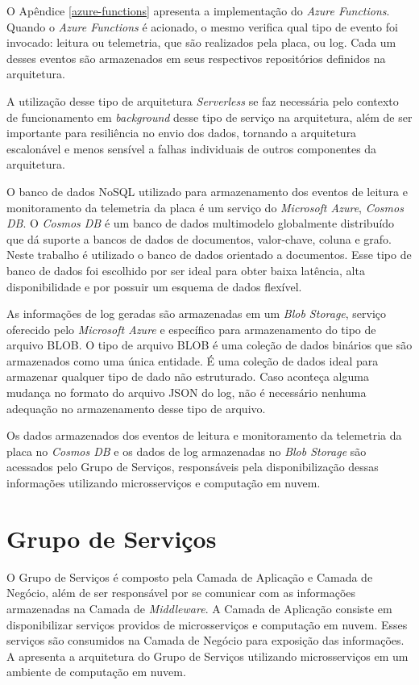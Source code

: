 O Apêndice \ref{azure-functions} apresenta a implementação do \textit{Azure Functions}. Quando o \textit{Azure Functions} é acionado, o mesmo verifica qual tipo de evento foi invocado: leitura ou telemetria, que são realizados pela placa, ou log. Cada um desses eventos são armazenados em seus respectivos repositórios definidos na arquitetura.

A utilização desse tipo de arquitetura \textit{Serverless} se faz necessária pelo contexto de funcionamento em \textit{background} desse tipo de serviço na arquitetura, além de ser importante para resiliência no envio dos dados, tornando a arquitetura escalonável e menos sensível a falhas individuais de outros componentes da arquitetura.

O banco de dados \acrshort{NoSQL} utilizado para armazenamento dos eventos de leitura e monitoramento da telemetria da placa é um serviço do \textit{Microsoft Azure}, \textit{Cosmos DB}. O \textit{Cosmos DB} é um banco de dados multimodelo globalmente distribuído que dá suporte a bancos de dados de documentos, valor-chave, coluna e grafo. Neste trabalho é utilizado o banco de dados orientado a documentos. Esse tipo de banco de dados foi escolhido por ser ideal para obter baixa latência, alta disponibilidade e por possuir um esquema de dados flexível.

As informações de log geradas são armazenadas em um \textit{Blob Storage}, serviço oferecido pelo \textit{Microsoft Azure} e específico para armazenamento do tipo de arquivo \acrfull{BLOB}. O tipo de arquivo \acrshort{BLOB} é uma coleção de dados binários que são armazenados como uma única entidade. É uma coleção de dados ideal para armazenar qualquer tipo de dado não estruturado. Caso aconteça alguma mudança no formato do arquivo \acrshort{JSON} do log, não é necessário nenhuma adequação no armazenamento desse tipo de arquivo.

Os dados armazenados dos eventos de leitura e monitoramento da telemetria da placa no \textit{Cosmos DB} e os dados de log armazenadas no \textit{Blob Storage} são acessados pelo Grupo de Serviços, responsáveis pela disponibilização dessas informações utilizando microsserviços e computação em nuvem.

\section{Grupo de Serviços}
\label{sec:grupo-serviços}

O Grupo de Serviços é composto pela Camada de Aplicação e Camada de Negócio, além de ser responsável por se comunicar com as informações armazenadas na Camada de \textit{Middleware}. A Camada de Aplicação consiste em disponibilizar serviços providos de microsserviços e computação em nuvem. Esses serviços são consumidos na Camada de Negócio para exposição das informações. A  apresenta a arquitetura do Grupo de Serviços utilizando microsserviços em um ambiente de computação em nuvem.

